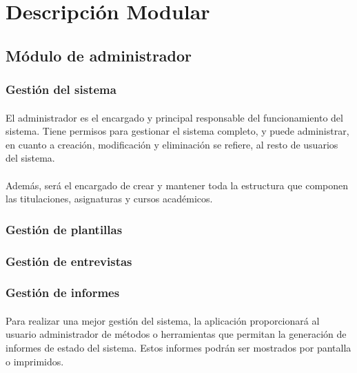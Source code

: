 \section{Descripción Modular}\label{descMod}

   \subsection{Módulo de administrador}

      \subsubsection{Gestión del sistema}

      \paragraph{}El administrador es el encargado y principal responsable
      del funcionamiento del sistema. Tiene permisos para gestionar el
      sistema completo, y puede administrar, en cuanto a creación, modificación
      y eliminación se refiere, al resto de usuarios del sistema.

      \paragraph{}Además, será el encargado de crear y mantener toda la
      estructura que componen las titulaciones, asignaturas y cursos
      académicos.

      \subsubsection{Gestión de plantillas}

      \subsubsection{Gestión de entrevistas}

      \subsubsection{Gestión de informes}

      \paragraph{}Para realizar una mejor gestión del sistema, la aplicación
      proporcionará al usuario administrador de métodos o herramientas que
      permitan la generación de informes de estado del sistema. Estos informes
      podrán ser mostrados por pantalla o imprimidos.

